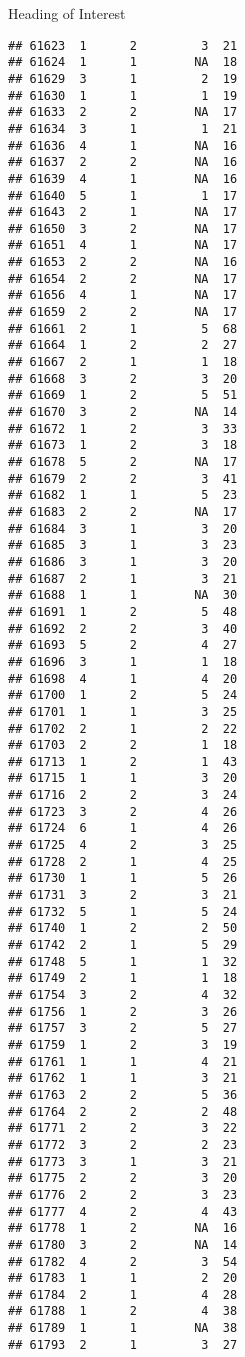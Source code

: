 \documentclass[
  ignorenonframetext,
]{beamer}
\begin{document}
\begin{frame}[fragile]{Heading of Interest}
\begin{verbatim}
## 61623  1      2         3  21
## 61624  1      1        NA  18
## 61629  3      1         2  19
## 61630  1      1         1  19
## 61633  2      2        NA  17
## 61634  3      1         1  21
## 61636  4      1        NA  16
## 61637  2      2        NA  16
## 61639  4      1        NA  16
## 61640  5      1         1  17
## 61643  2      1        NA  17
## 61650  3      2        NA  17
## 61651  4      1        NA  17
## 61653  2      2        NA  16
## 61654  2      2        NA  17
## 61656  4      1        NA  17
## 61659  2      2        NA  17
## 61661  2      1         5  68
## 61664  1      2         2  27
## 61667  2      1         1  18
## 61668  3      2         3  20
## 61669  1      2         5  51
## 61670  3      2        NA  14
## 61672  1      2         3  33
## 61673  1      2         3  18
## 61678  5      2        NA  17
## 61679  2      2         3  41
## 61682  1      1         5  23
## 61683  2      2        NA  17
## 61684  3      1         3  20
## 61685  3      1         3  23
## 61686  3      1         3  20
## 61687  2      1         3  21
## 61688  1      1        NA  30
## 61691  1      2         5  48
## 61692  2      2         3  40
## 61693  5      2         4  27
## 61696  3      1         1  18
## 61698  4      1         4  20
## 61700  1      2         5  24
## 61701  1      1         3  25
## 61702  2      1         2  22
## 61703  2      2         1  18
## 61713  1      2         1  43
## 61715  1      1         3  20
## 61716  2      2         3  24
## 61723  3      2         4  26
## 61724  6      1         4  26
## 61725  4      2         3  25
## 61728  2      1         4  25
## 61730  1      1         5  26
## 61731  3      2         3  21
## 61732  5      1         5  24
## 61740  1      2         2  50
## 61742  2      1         5  29
## 61748  5      1         1  32
## 61749  2      1         1  18
## 61754  3      2         4  32
## 61756  1      2         3  26
## 61757  3      2         5  27
## 61759  1      2         3  19
## 61761  1      1         4  21
## 61762  1      1         3  21
## 61763  2      2         5  36
## 61764  2      2         2  48
## 61771  2      2         3  22
## 61772  3      2         2  23
## 61773  3      1         3  21
## 61775  2      2         3  20
## 61776  2      2         3  23
## 61777  4      2         4  43
## 61778  1      2        NA  16
## 61780  3      2        NA  14
## 61782  4      2         3  54
## 61783  1      1         2  20
## 61784  2      1         4  28
## 61788  1      2         4  38
## 61789  1      1        NA  38
## 61793  2      1         3  27

\end{verbatim}
\end{frame}
\end{document}
